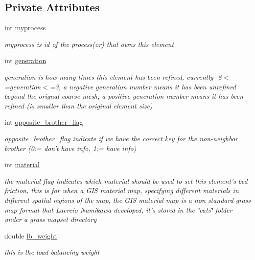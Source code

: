 \subsection*{Private Attributes}
\begin{CompactItemize}
\item 
int \hyperlink{classElement_r0}{myprocess}
\begin{CompactList}\small\item\em myprocess is id of the process(or) that owns this element \item\end{CompactList}\item 
int \hyperlink{classElement_r1}{generation}
\begin{CompactList}\small\item\em generation is how many times this element has been refined, currently -8$<$=generation$<$=3, a negative generation number means it has been unrefined beyond the orignal coarse mesh, a positive generation number means it has been refined (is smaller than the original element size) \item\end{CompactList}\item 
int \hyperlink{classElement_r2}{opposite\_\-brother\_\-flag}
\begin{CompactList}\small\item\em opposite\_\-brother\_\-flag indicate if we have the correct key for the non-neighbor brother (0:= don't have info, 1:= have info) \item\end{CompactList}\item 
int \hyperlink{classElement_r3}{material}
\begin{CompactList}\small\item\em the material flag indicates which material should be used to set this element's bed friction, this is for when a GIS material map, specifying different materials in different spatial regions of the map, the GIS material map is a non standard grass map format that Laercio Namikawa developed, it's stored in the \char`\"{}cats\char`\"{} folder under a grass mapset directory \item\end{CompactList}\item 
double \hyperlink{classElement_r4}{lb\_\-weight}
\begin{CompactList}\small\item\em this is the load-balancing weight \item\end{CompactList}\item 

\end{CompactItemize}
